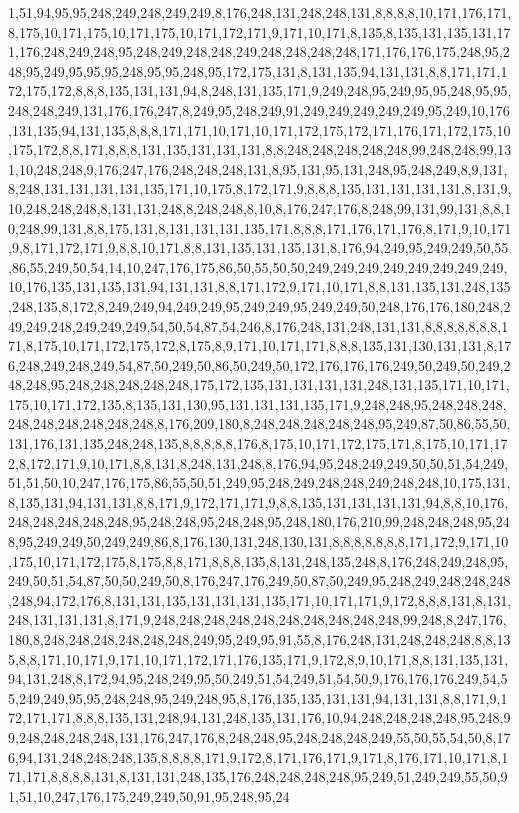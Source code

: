 1,51,94,95,95,248,249,248,249,249,8,176,248,131,248,248,131,8,8,8,8,10,171,176,171,8,175,10,171,175,10,171,175,10,171,172,171,9,171,10,171,8,135,8,135,131,135,131,171,176,248,249,248,95,248,249,248,248,249,248,248,248,248,171,176,176,175,248,95,248,95,249,95,95,95,248,95,95,248,95,172,175,131,8,131,135,94,131,131,8,8,171,171,172,175,172,8,8,8,135,131,131,94,8,248,131,135,171,9,249,248,95,249,95,95,248,95,95,248,248,249,131,176,176,247,8,249,95,248,249,91,249,249,249,249,249,95,249,10,176,131,135,94,131,135,8,8,8,171,171,10,171,10,171,172,175,172,171,176,171,172,175,10,175,172,8,8,171,8,8,8,131,135,131,131,131,8,8,248,248,248,248,248,99,248,248,99,131,10,248,248,9,176,247,176,248,248,248,131,8,95,131,95,131,248,95,248,249,8,9,131,8,248,131,131,131,131,135,171,10,175,8,172,171,9,8,8,8,135,131,131,131,131,8,131,9,10,248,248,248,8,131,131,248,8,248,248,8,10,8,176,247,176,8,248,99,131,99,131,8,8,10,248,99,131,8,8,175,131,8,131,131,131,135,171,8,8,8,171,176,171,176,8,171,9,10,171,9,8,171,172,171,9,8,8,10,171,8,8,131,135,131,135,131,8,176,94,249,95,249,249,50,55,86,55,249,50,54,14,10,247,176,175,86,50,55,50,50,249,249,249,249,249,249,249,249,10,176,135,131,135,131,94,131,131,8,8,171,172,9,171,10,171,8,8,131,135,131,248,135,248,135,8,172,8,249,249,94,249,249,95,249,249,95,249,249,50,248,176,176,180,248,249,249,248,249,249,249,54,50,54,87,54,246,8,176,248,131,248,131,131,8,8,8,8,8,8,8,171,8,175,10,171,172,175,172,8,175,8,9,171,10,171,171,8,8,8,135,131,130,131,131,8,176,248,249,248,249,54,87,50,249,50,86,50,249,50,172,176,176,176,249,50,249,50,249,248,248,95,248,248,248,248,248,175,172,135,131,131,131,131,248,131,135,171,10,171,175,10,171,172,135,8,135,131,130,95,131,131,131,135,171,9,248,248,95,248,248,248,248,248,248,248,248,248,8,176,209,180,8,248,248,248,248,248,95,249,87,50,86,55,50,131,176,131,135,248,248,135,8,8,8,8,8,176,8,175,10,171,172,175,171,8,175,10,171,172,8,172,171,9,10,171,8,8,131,8,248,131,248,8,176,94,95,248,249,249,50,50,51,54,249,51,51,50,10,247,176,175,86,55,50,51,249,95,248,249,248,248,249,248,248,10,175,131,8,135,131,94,131,131,8,8,171,9,172,171,171,9,8,8,135,131,131,131,131,94,8,8,10,176,248,248,248,248,248,95,248,248,95,248,248,95,248,180,176,210,99,248,248,248,95,248,95,249,249,50,249,249,86,8,176,130,131,248,130,131,8,8,8,8,8,8,8,171,172,9,171,10,175,10,171,172,175,8,175,8,8,171,8,8,8,135,8,131,248,135,248,8,176,248,249,248,95,249,50,51,54,87,50,50,249,50,8,176,247,176,249,50,87,50,249,95,248,249,248,248,248,248,94,172,176,8,131,131,135,131,131,131,135,171,10,171,171,9,172,8,8,8,131,8,131,248,131,131,131,8,171,9,248,248,248,248,248,248,248,248,248,248,99,248,8,247,176,180,8,248,248,248,248,248,248,249,95,249,95,91,55,8,176,248,131,248,248,248,8,8,135,8,8,171,10,171,9,171,10,171,172,171,176,135,171,9,172,8,9,10,171,8,8,131,135,131,94,131,248,8,172,94,95,248,249,95,50,249,51,54,249,51,54,50,9,176,176,176,249,54,55,249,249,95,95,248,248,95,249,248,95,8,176,135,135,131,131,94,131,131,8,8,171,9,172,171,171,8,8,8,135,131,248,94,131,248,135,131,176,10,94,248,248,248,248,95,248,99,248,248,248,248,131,176,247,176,8,248,248,95,248,248,248,249,55,50,55,54,50,8,176,94,131,248,248,248,135,8,8,8,8,171,9,172,8,171,176,171,9,171,8,176,171,10,171,8,171,171,8,8,8,8,131,8,131,131,248,135,176,248,248,248,248,95,249,51,249,249,55,50,91,51,10,247,176,175,249,249,50,91,95,248,95,24